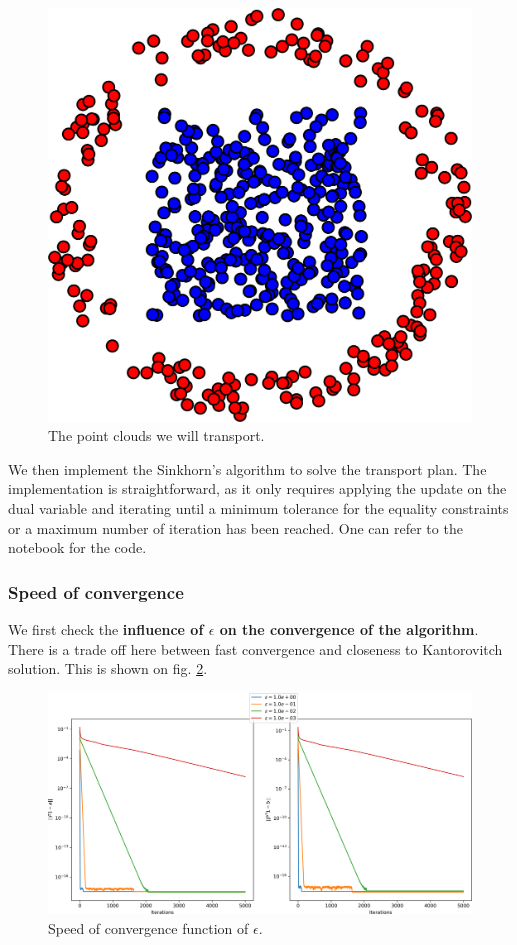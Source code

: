 \begin{figure}[h]
    \centering
    \includegraphics[width=.5\linewidth]{samples/2/two_point_clouds.png}
    \caption{The point clouds we will transport. }
    \label{fig:two_point_cloud}
\end{figure}

We then implement the Sinkhorn's algorithm to solve the transport plan. The implementation is straightforward, as it only requires applying the update on the dual variable and iterating until a minimum tolerance for the equality constraints or a maximum number of iteration has been reached. One can refer to the notebook for the code. 

\subsubsection{Speed of convergence}

We first check the \textbf{influence of $\epsilon$ on the convergence of the algorithm}. There is a trade off here between fast convergence and closeness to Kantorovitch solution. This is shown on fig. \ref{fig:violation_eps}.

\begin{figure}[h]
    \centering
    \includegraphics[width=1\textwidth]{samples/2/violation_eps.png}
    \caption{Speed of convergence function of $\epsilon$.}
    \label{fig:violation_eps}
\end{figure}

